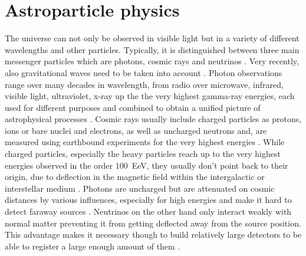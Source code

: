 \chapter{Astroparticle physics}

The universe can not only be observed in visible light but in a variety of different wavelengths and other particles.
Typically, it is distinguished between three main messenger particles which are photons, cosmic rays and neutrinos .
Very recently, also gravitational waves need to be taken into account .
Photon observations range over many decades in wavelength, from radio over microwave, infrared, visible light, ultraviolet, x-ray up the the very highest gamma-ray energies, each used for different purposes and combined to obtain a unified picture of astrophysical processes .
Cosmic rays usually include charged particles as protons, ions or bare nuclei and electrons, as well as uncharged neutrons and, are measured using earthbound experiments for the very highest energies .
While charged particles, especially the heavy particles reach up to the very highest energies observed in the order \SI{100}{\exa\eV}, they usually don't point back to their origin, due to deflection in the magnetic field within the intergalactic or interstellar medium .
Photons are uncharged but are attenuated on cosmic distances by various influences, especially for high energies and make it hard to detect faraway sources .
Neutrinos on the other hand only interact weakly with normal matter preventing it from getting deflected away from the source position.
This advantage makes it necessary though to build relatively large detectors to be able to register a large enough amount of them .

